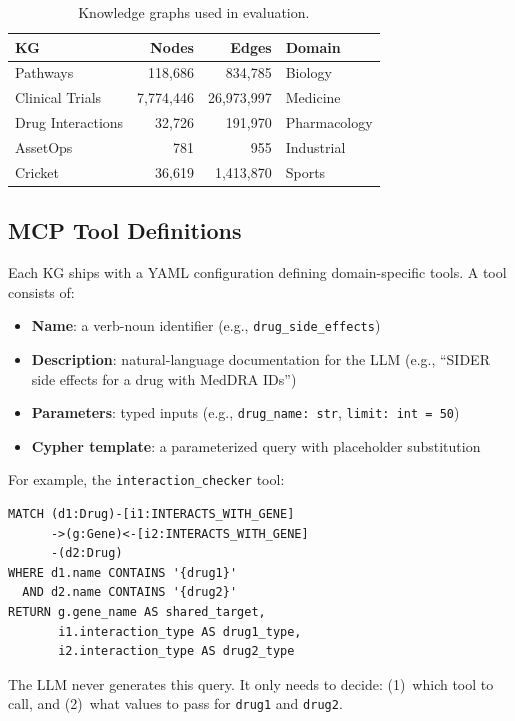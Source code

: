 \documentclass[sigconf]{acmart}
\begin{document}
\begin{table}[t]
\centering
\caption{Knowledge graphs used in evaluation.}
\label{tab:kgs}
\small
\begin{tabular}{@{}lrrl@{}}
\toprule
\textbf{KG} & \textbf{Nodes} & \textbf{Edges} & \textbf{Domain} \\
\midrule
Pathways        & 118,686   &    834,785 & Biology \\
Clinical Trials & 7,774,446 & 26,973,997 & Medicine \\
Drug Interactions & 32,726  &    191,970 & Pharmacology \\
AssetOps        &       781 &        955 & Industrial \\
Cricket         &    36,619 &  1,413,870 & Sports \\
\bottomrule
\end{tabular}
\end{table}

\subsection{MCP Tool Definitions}

Each KG ships with a YAML configuration defining domain-specific
tools.  A tool consists of:

\begin{itemize}
\item \textbf{Name}: a verb-noun identifier (e.g.,
  \texttt{drug\_side\_effects})
\item \textbf{Description}: natural-language documentation for the
  LLM (e.g., ``SIDER side effects for a drug with MedDRA IDs'')
\item \textbf{Parameters}: typed inputs (e.g.,
  \texttt{drug\_name: str}, \texttt{limit: int = 50})
\item \textbf{Cypher template}: a parameterized query with
  placeholder substitution
\end{itemize}

For example, the \texttt{interaction\_checker} tool:

\begin{lstlisting}
MATCH (d1:Drug)-[i1:INTERACTS_WITH_GENE]
      ->(g:Gene)<-[i2:INTERACTS_WITH_GENE]
      -(d2:Drug)
WHERE d1.name CONTAINS '{drug1}'
  AND d2.name CONTAINS '{drug2}'
RETURN g.gene_name AS shared_target,
       i1.interaction_type AS drug1_type,
       i2.interaction_type AS drug2_type
\end{lstlisting}

The LLM never generates this query.  It only needs to decide:
(1)~which tool to call, and (2)~what values to pass for
\texttt{drug1} and \texttt{drug2}.
\end{document}
